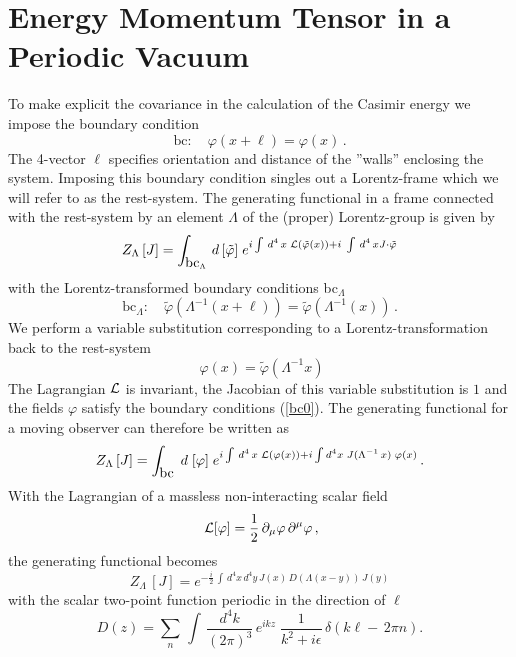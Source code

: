 \documentclass[a4paper,twocolumn,eqsecnum,aps]{revtex4}
\begin{document}



\section{Energy Momentum Tensor in a Periodic Vacuum}
To make explicit  the covariance in the calculation of the Casimir energy we impose the boundary condition  
\begin{equation}
  \label{bc0}
  \mbox{bc}:\quad \varphi (x+\ell) = \varphi (x) \, .
\end{equation}
The 4-vector $\ell$ specifies orientation and distance of the ''walls'' enclosing the system. Imposing this boundary condition singles out a Lorentz-frame which we will refer to as the rest-system.  
The generating  functional in a frame 
connected with the rest-system by an element $\Lambda$ of the (proper) Lorentz-group is given by
$$
Z _{\Lambda}\, [J] = \int_{\mbox{bc}_{\Lambda}} \, d \, [\tilde{\varphi}]  \; e^{i \int \, d^{4}\, x \; {\cal L} (\tilde{\varphi} (x)) + i \; \int \, d^{4}\, x J \cdot \tilde{\varphi}}
$$
with the  Lorentz-transformed boundary conditions  bc$_{\Lambda}$ 
\begin{equation}
  \label{bc1}
\mbox{bc}_{\Lambda}:\quad \tilde{\varphi} (\Lambda ^{-1}(x + \ell) ) = 
 \tilde{\varphi} (\Lambda^{-1} (x )) \,.
\end{equation}
We perform a variable substitution  corresponding to a 
Lorentz-transformation   back to the rest-system
$$ \; \varphi(x) = \tilde{\varphi} (\Lambda^{-1} x)$$
The Lagrangian  ${\cal L}$ is invariant, the Jacobian of this variable substitution is $1$ and the 
fields $\varphi$ satisfy the boun\-dary conditions (\ref{bc0}).
The generating functional for a  moving observer can therefore be written as 
$$
Z _{\Lambda}\, [J] = \int_{\mbox{bc}} \; d \; [ \varphi ] \; e^{i \int \, d^{4}\, x \; 
{\cal L} (\varphi(x)) + i \int d^{4} x \; J (\Lambda^{-1} \,x) \; \varphi (x)} \, .$$
With the Lagrangian of a massless non-interacting scalar field
$$ \; {\cal L}[\varphi] =  \frac{1}{2}\,\partial _{\mu} \varphi \, \partial ^{\mu} \varphi \,,$$ 
the generating functional becomes
$$
Z_{\Lambda}\, [J] =e^{- \frac{i}{2} \, \int \, d^{4} x \, d^{4} y \, J(x) \, D(\Lambda (x-y)) \, J(y)}$$
with the scalar two-point function periodic in the direction of $\ell$
\begin{equation}
  \label{d3}
D (z) = \sum_{n} \, \int \, \frac{d^{4}k}{(2 \pi )^{3}} \,e^{i k z}
\; \frac{1}{k^{2} + i \epsilon}\, \delta \left(k\ell - \,2 \pi n
\right ).  
\end{equation}
\end{document}
